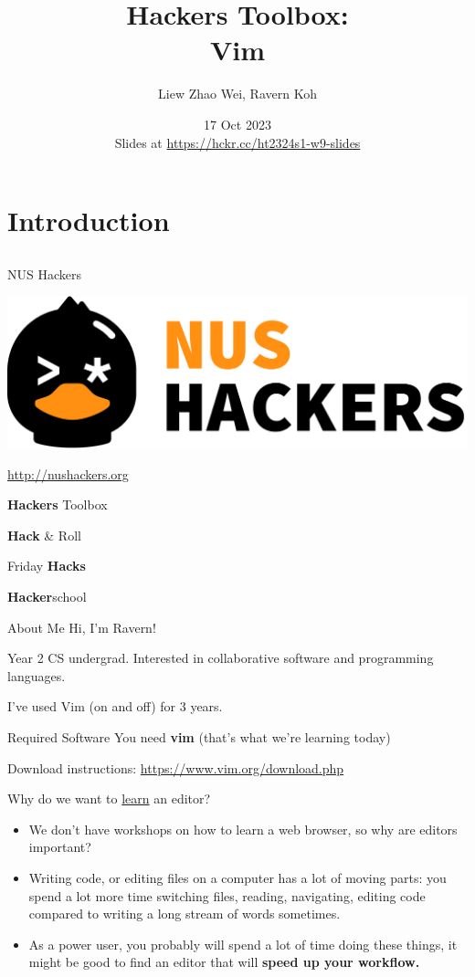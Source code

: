 \documentclass[12pt]{beamer}
\title{Hackers Toolbox: \\Vim}
\author{Liew Zhao Wei, Ravern Koh}
\date{17 Oct 2023 \\ Slides at \url{https://hckr.cc/ht2324s1-w9-slides}}
\begin{document}
\frame[plain]{\titlepage}

\section{Introduction}
\subsection{}

\begin{frame}{NUS Hackers}

    \begin{center}
        \includegraphics[width=0.5\linewidth]{../NUSHackers}

        \url{http://nushackers.org}
    \end{center}

    \begin{center}
        \textbf{Hackers} Toolbox

        \textbf{Hack} \& Roll

        Friday \textbf{Hacks}

        \textbf{Hacker}school
    \end{center}

\end{frame}

\begin{frame}{About Me}
    Hi, I'm Ravern!

    Year 2 CS undergrad. Interested in collaborative software and programming languages.

    I've used Vim (on and off) for 3 years.
\end{frame}

\begin{frame}{Required Software}
    You need \textbf{vim} (that's what we're learning today)

    Download instructions: \url{https://www.vim.org/download.php}
\end{frame}

\begin{frame}{Why do we want to \underline{learn} an editor?}
    \begin{itemize}
        \item We don't have workshops on how to learn a web browser, so why are editors important?
        \item Writing code, or editing files on a computer has a lot of moving parts: you spend a lot more time switching files, reading, navigating, editing code compared to writing a long stream of words sometimes.
        \item As a power user, you probably will spend a lot of time doing these things, it might be good to find an editor that will \textbf{speed up your workflow.}
    \end{itemize}
\end{frame}
\end{document}
